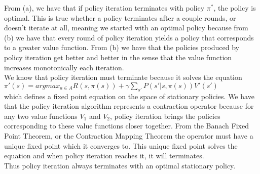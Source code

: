 \documentclass[12pt]{scrartcl}
\begin{document}
From (a), we have that if policy iteration terminates with policy $\pi^*$, the policy is optimal. This is true whether a policy terminates after a couple rounds, or doesn't iterate at all, meaning we started with an optimal policy because from (b) we have that every round of policy iteration yields a policy that corresponds to a greater value function. From (b) we have that the policies produced by policy iteration get better and better in the sense that the value function increases monotonically each iteration. \\

We know that policy iteration must terminate because it solves the equation \\ $\displaystyle{\pi '(s) = argmax_{a \in A} R(s, \pi(s)) + \gamma \sum_{s'}{P(s' | s, \pi(s))V'(s')}}$ \\
which defines a fixed point equation on the space of stationary policies. We have that the policy iteration algorithm represents a contraction operator because for any two value functions $V_1$ and $V_2$, policy iteration brings the policies corresponding to these value functions closer together. From the Banach Fixed Point Theorem, or the Contraction Mapping Theorem the operator must have a unique fixed point which it converges to. This unique fixed point solves the equation and when policy iteration reaches it, it will terminates. \\

Thus policy iteration always terminates with an optimal stationary policy.
\end{document}
